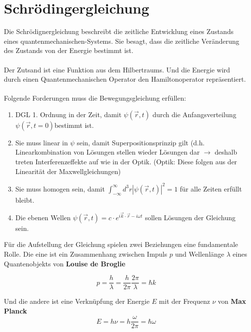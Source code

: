 




\section*{Schrödingergleichung}

Die Schrödignergleichung beschreibt die zeitliche Entwicklung eines Zustands eines quantenmechanischen-Systems. Sie besagt, dass die zeitliche Veränderung des Zustands von der Energie bestimmt ist.\\
\\
Der Zutsand ist eine Funktion aus dem Hilbertraums. Und die Energie wird durch einen Quantenmechanischen Operator den Hamiltonoperator repräsentiert.\\
\\
Folgende Forderungen muss die Bewegungsgleichung erfüllen:
\begin{enumerate}
\item DGL 1. Ordnung in der Zeit, damit $\psi(\vec{r},t)$ durch die Anfangsverteilung
  $\psi(\vec{r},t=0)$bestimmt ist.
\item Sie muss linear in $\psi$ sein, damit Superpositionsprinzip gilt (d.h.
  Linearkombination von Lösungen stellen wieder Lösungen dar $\rightarrow$ deshalb
  treten Interferenzeffekte auf wie in der Optik. (Optik: Diese folgen
  aus der Linearität der Maxwellgleichungen)
\item Sie muss homogen sein, damit
  $\int_{-\infty}^{\infty}d^{3}r|\psi(\vec{r},t)|^{2}=1$ für
  alle Zeiten erfüllt bleibt.
\item Die ebenen Wellen \(\psi(\vec{r},t)=c\cdot  e^{i\vec{k}\cdot\vec{r}-i\omega t}\) sollen  Lösungen der Gleichung sein. 
\end{enumerate}

Für die Aufstellung der Gleichung spielen zwei Beziehungen eine fundamentale Rolle. Die eine ist ein Zusammenhang zwischen Impuls \(p\) und Wellenlänge \(\lambda\) eines Quantenobjekts von \textbf{Louise de Broglie}

\begin{equation}
  \label{eq:3}
  p = \frac{h}{\lambda} = \frac{h}{2\pi}\frac{2\pi}{\lambda} = \hbar k
\end{equation}

Und die andere ist eine Verknüpfung der Energie \(E\) mit der Frequenz \(\nu\) von \textbf{Max Planck}
\begin{equation}
  \label{eq:2}
  E=h\nu=h\frac{\omega}{2\pi} =\hbar \omega
\end{equation}

